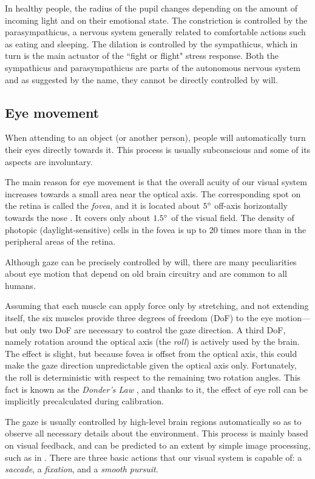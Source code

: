 In healthy people, the radius of the pupil changes depending on the amount of incoming light and on their emotional state.
The constriction is controlled by the parasympathicus, a nervous system generally related to comfortable actions such as eating and sleeping.
The dilation is controlled by the sympathicus, which in turn is the main actuator of the ``fight or flight" stress response.
Both the sympathicus and parasympathicus are parts of the autonomous nervous system and as suggested by the name, they cannot be directly controlled by will.

\subsection{Eye movement}

When attending to an object (or another person), people will automatically turn their eyes directly towards it.
This process is usually subconscious and some of its aspects are involuntary.

The main reason for eye movement is that the overall acuity of our visual system increases towards a small area near the optical axis.
The corresponding spot on the retina is called the \textit{fovea}, and it is located about $5\degree$ off-axis horizontally towards the nose \cite{villanueva08}.
It covers only about $1.5\degree$ of the visual field.
The density of photopic (daylight-sensitive) cells in the fovea is up to 20 times more than in the peripheral areas of the retina.

Although gaze can be precisely controlled by will, there are many peculiarities about eye motion that depend on old brain circuitry and are common to all humans.

Assuming that each muscle can apply force only by stretching, and not extending itself, the six muscles provide three degrees of freedom (DoF) to the eye motion---but only two DoF are necessary to control the gaze direction.
A third DoF, namely rotation around the optical axis (the \textit{roll}) is actively used by the brain.
The effect is slight, but because fovea is offset from the optical axis, this could make the gaze direction unpredictable given the optical axis only.
Fortunately, the roll is deterministic with respect to the remaining two rotation angles.
This fact is known as the \textit{Donder's Law} \cite{hansen10}, and thanks to it, the effect of eye roll can be implicitly precalculated during calibration.

The gaze is usually controlled by high-level brain regions automatically so as to observe all necessary details about the environment.
This process is mainly based on visual feedback, and can be predicted to an extent by simple image processing, such as in \cite{yucel09}.
There are three basic actions that our visual system is capable of: a \textit{saccade}, a \textit{fixation}, and a \textit{smooth pursuit}.


